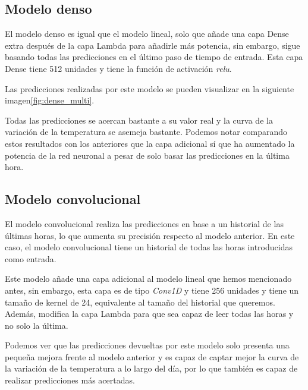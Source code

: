 \subsection{Modelo denso}

El modelo denso es igual que el modelo lineal, solo que añade una capa Dense extra después de la capa Lambda para añadirle más potencia, sin embargo, sigue basando todas las predicciones en el último paso de tiempo de entrada. Esta capa Dense tiene 512 unidades y tiene la función de activación \textit{relu}.


Las predicciones realizadas por este modelo se pueden visualizar en la siguiente imagen\ref{fig:dense_multi}.


Todas las predicciones se acercan bastante a su valor real y la curva de la variación de la temperatura se asemeja bastante. Podemos notar comparando estos resultados con los anteriores que la capa adicional sí que ha aumentado la potencia de la red neuronal a pesar de solo basar las predicciones en la última hora.

\subsection{Modelo convolucional}

El modelo convolucional realiza las predicciones en base a un historial de las últimas horas, lo que aumenta su precisión respecto al modelo anterior. En este caso, el modelo convolucional tiene un historial de todas las horas introducidas como entrada.

\par

Este modelo añade una capa adicional al modelo lineal que hemos mencionado antes, sin embargo, esta capa es de tipo \textit{Conv1D} y tiene 256 unidades y tiene un tamaño de kernel de 24, equivalente al tamaño del historial que queremos. Además, modifica la capa Lambda para que sea capaz de leer todas las horas y no solo la última.


Podemos ver que las predicciones devueltas por este modelo solo presenta una pequeña mejora frente al modelo anterior y es capaz de captar mejor la curva de la variación de la temperatura a lo largo del día, por lo que también es capaz de realizar predicciones más acertadas.

